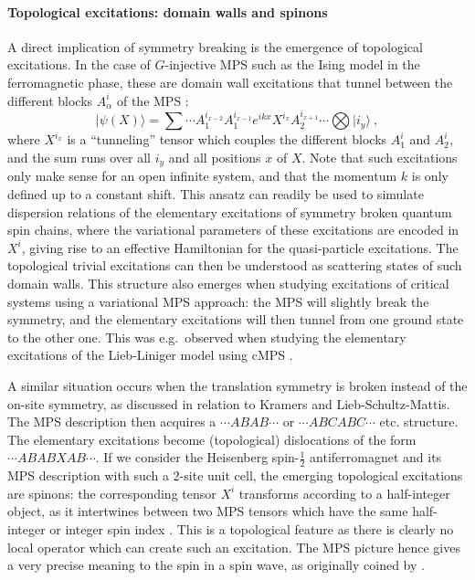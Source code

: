\documentclass[rmp,aps,reprint,superscriptaddress,nobalancelastpage]{revtex4-1}
\newcommand{\be}{\begin{equation}}
\newcommand{\ee}{\end{equation}}
\begin{document}
\paragraph{Topological excitations: domain walls and spinons}
A direct implication of symmetry breaking is the emergence of topological excitations. In the case of $G$-injective MPS such as the Ising model in the ferromagnetic phase, these are domain wall excitations that tunnel between the different blocks $A^i_\alpha$ of the MPS \cite{haegeman:mps-ansatz-excitations}:
\be
    \vert\psi(X)\rangle=\sum \cdots
    A_{1}^{i_{x-2}}A_1^{i_{x-1}}
    e^{ikx}X^{i_{x}}A_2^{i_{x+1}}\cdots
    \bigotimes\vert i_y\rangle\ ,
\ee
where $X^{i_x}$ is a ``tunneling'' tensor which couples the different blocks $A^i_1$ and $A^i_2$,
and the sum runs over all $i_y$ and all positions $x$ of $X$.
Note that such excitations only make sense for an open infinite system, and that the momentum $k$ is only defined up to a constant shift. This ansatz can readily be used to simulate dispersion relations of the elementary excitations of symmetry broken quantum spin chains, where the variational parameters of these excitations are encoded in $X^i$, giving rise to an effective Hamiltonian for the quasi-particle excitations. The topological trivial excitations can then be understood as scattering states of such domain walls. This structure also emerges when studying excitations of critical systems using a variational MPS approach: the MPS will slightly break the symmetry, and the elementary excitations will then tunnel from one ground state to the other one. This was e.g.\ observed when studying the elementary excitations of the Lieb-Liniger model using cMPS \cite{draxler2013particles}.

A similar  situation occurs when the translation symmetry is broken instead of the on-site symmetry, as discussed in relation to Kramers and Lieb-Schultz-Mattis. The MPS description then acquires a $\cdots ABAB\cdots$  or $\cdots ABCABC\cdots$ etc. structure. The elementary excitations become (topological) dislocations of the form  $\cdots ABABXAB\cdots$. If we consider the Heisenberg spin-$\tfrac12$ antiferromagnet and its MPS description with such a 2-site unit cell, the emerging topological excitations are spinons: the corresponding tensor $X^i$ transforms according to a half-integer object, as it intertwines between two MPS tensors which have the same half-integer or integer spin index \cite{zauner2018topological}. This is a topological feature as there is clearly no local operator which can create such an excitation. The MPS picture hence gives a very precise meaning to the spin in a spin wave, as originally coined by \citet{faddeev1981spin}.
\end{document}

